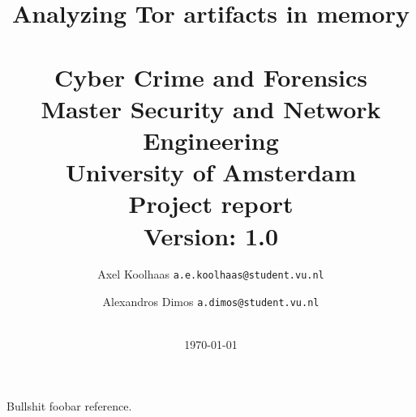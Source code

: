 \documentclass[a4paper,11pt]{article}
\begin{document}
\title{Analyzing Tor artifacts in memory \\~\\
\large{Cyber Crime and Forensics \\
Master Security and Network Engineering\\  University of Amsterdam\\
Project report\\}
\textbf{Version:} 1.0}
\author{
    Axel Koolhaas \texttt{a.e.koolhaas@student.vu.nl} \and
    Alexandros Dimos \texttt{a.dimos@student.vu.nl}\\
    \\
}
\date{
    \textnormal \today
}
\maketitle

\clearpage


\clearpage

\tableofcontents
\clearpage


Bullshit foobar reference.
\cite{piscitello1994ftp}





\printbibliography
\end{document}
